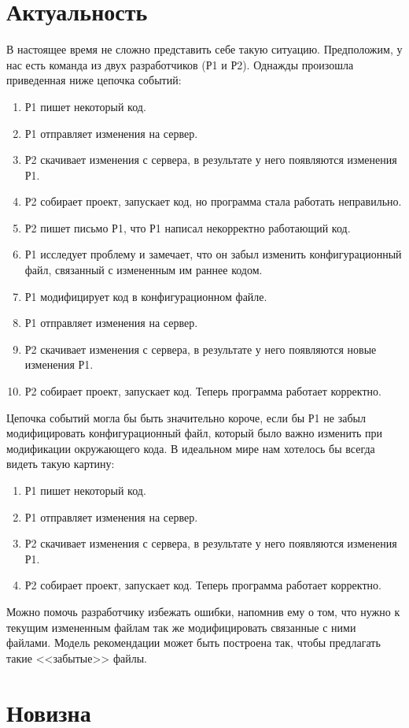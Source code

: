 \documentclass[times]{itmo-student-thesis}
\begin{document}
\section{Актуальность}
В настоящее время не сложно представить себе такую ситуацию. Предположим, у нас есть команда из двух разработчиков (Р1 и Р2). Однажды произошла приведенная ниже цепочка событий:
    \begin{enumerate}
		\item Р1 пишет некоторый код.
		\item Р1 отправляет изменения на сервер.
		\item Р2 скачивает изменения с сервера, в результате у него появляются изменения Р1.
		\item Р2 собирает проект, запускает код, но программа стала работать неправильно.
		\item Р2 пишет письмо Р1, что Р1 написал некорректно работающий код. 
		\item Р1 исследует проблему и замечает, что он забыл изменить конфигурационный файл, связанный с измененным им раннее кодом.
		\item Р1 модифицирует код в конфигурационном файле.
		\item Р1 отправляет изменения на сервер.
		\item Р2 скачивает изменения с сервера, в результате у него появляются новые изменения Р1.
		\item Р2 собирает проект, запускает код. Теперь программа работает корректно.
	\end{enumerate}
Цепочка событий могла бы быть значительно короче, если бы Р1 не забыл модифицировать конфигурационный файл, который было важно изменить при модификации окружающего кода. В идеальном мире нам хотелось бы всегда видеть такую картину:
    \begin{enumerate}
		\item Р1 пишет некоторый код.
		\item Р1 отправляет изменения на сервер.
		\item Р2 скачивает изменения с сервера, в результате у него появляются изменения Р1.
		\item Р2 собирает проект, запускает код. Теперь программа работает корректно.
	\end{enumerate}
Можно помочь разработчику избежать ошибки, напомнив ему о том, что нужно к текущим измененным файлам так же модифицировать связанные с ними файлами. Модель рекомендации может быть построена так, чтобы предлагать такие <<забытые>> файлы.
\section{Новизна}
\end{document}
